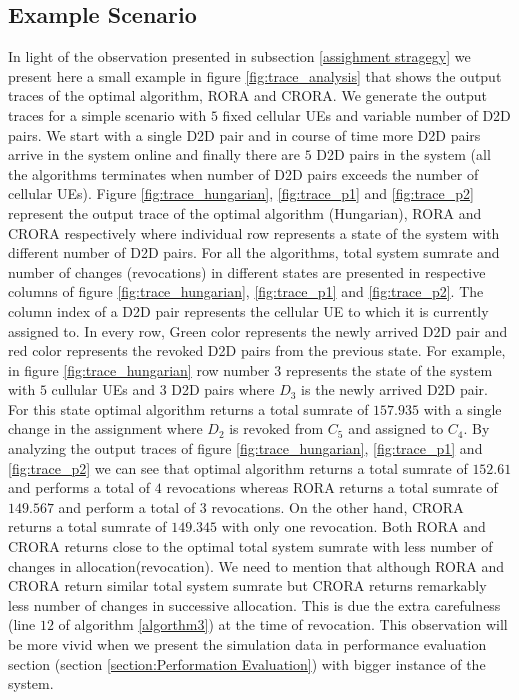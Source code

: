 \documentclass[times]{dacauth}
\begin{document}
\subsection{Example Scenario} 
\smallskip

\noindent
In light of the observation presented in subsection \ref{assighment stragegy} we present here a small example in figure \ref{fig:trace_analysis} that shows the output traces of the optimal algorithm, RORA and CRORA. We generate the output traces for a simple scenario with $5$ fixed cellular UEs and variable number of D2D pairs. We start with a single D2D pair and in course of time more D2D pairs arrive in the system online and finally there are $5$ D2D pairs in the system (all the algorithms terminates when number of D2D pairs exceeds the number of cellular UEs). Figure \ref{fig:trace_hungarian}, \ref{fig:trace_p1} and  \ref{fig:trace_p2} represent the output trace of the optimal algorithm (Hungarian), RORA and CRORA respectively where individual row represents a state of the system with different number of D2D pairs. For all the algorithms, total system sumrate and number of changes (revocations) in different states are presented in respective columns of figure \ref{fig:trace_hungarian}, \ref{fig:trace_p1} and  \ref{fig:trace_p2}. The column index of a D2D pair represents the cellular UE to which it is currently assigned to. In every row, Green color represents the newly arrived D2D pair and red color represents the revoked D2D pairs from the previous state. For example, in figure \ref{fig:trace_hungarian} row number $3$ represents the state of the system with $5$ cullular UEs and $3$ D2D pairs where $D_3$ is the newly arrived D2D pair. For this state optimal algorithm returns a total sumrate of $157.935$ with a single change in the assignment where $D_2$ is revoked from $C_5$ and assigned to $C_4$. By analyzing the output traces of figure \ref{fig:trace_hungarian}, \ref{fig:trace_p1} and  \ref{fig:trace_p2} we can see that optimal algorithm returns a total sumrate of $152.61$ and performs a total of $4$ revocations whereas RORA returns a total sumrate of $149.567$ and perform a total of $3$ revocations. On the other hand, CRORA returns a total sumrate of $149.345$ with only one revocation. Both RORA and CRORA returns close to the optimal total system sumrate  with less number of changes in allocation(revocation). We need to mention that although RORA and CRORA return similar total system sumrate but CRORA returns remarkably less number of changes in successive allocation. This is due the extra carefulness (line $12$ of algorithm \ref{algorthm3}) at the time of revocation. This observation will be more vivid when we present the simulation data in performance evaluation section (section \ref{section:Performation Evaluation}) with bigger instance of the system. 
\end{document}
